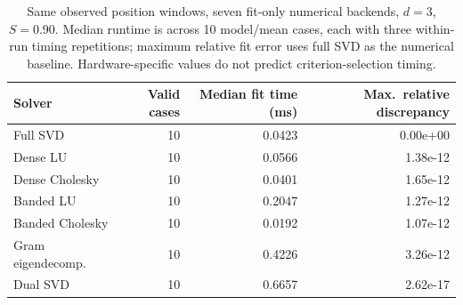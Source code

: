 \begin{table}[t]
\caption{Same observed position windows, seven fit-only numerical backends, $d=3$, $S=0.90$. Median runtime is across 10 model/mean cases, each with three within-run timing repetitions; maximum relative fit error uses full SVD as the numerical baseline. Hardware-specific values do not predict criterion-selection timing.}
\label{tab:solver}\centering
\begin{tabular}{lrrr}\toprule
Solver & Valid cases & Median fit time (ms) & Max.\ relative discrepancy \\
\midrule
Full SVD & 10 & 0.0423 & 0.00e+00 \\
Dense LU & 10 & 0.0566 & 1.38e-12 \\
Dense Cholesky & 10 & 0.0401 & 1.65e-12 \\
Banded LU & 10 & 0.2047 & 1.27e-12 \\
Banded Cholesky & 10 & 0.0192 & 1.07e-12 \\
Gram eigendecomp. & 10 & 0.4226 & 3.26e-12 \\
Dual SVD & 10 & 0.6657 & 2.62e-17 \\
\bottomrule
\end{tabular}
\end{table}
